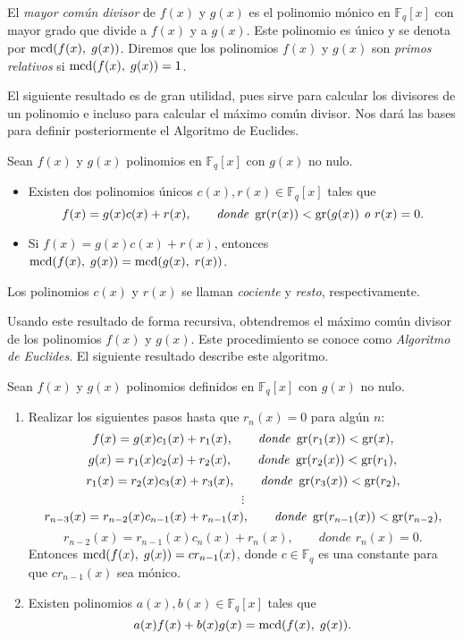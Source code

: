 El \emph{mayor común divisor} de $f(x)$ y $g(x)$ es el polinomio mónico en $\mathbb{F}_q[x]$ con mayor grado que divide a $f(x)$ y a $g(x)$. Este polinomio es único y se denota por $\operatorname{mcd}(f(x), \; g(x))$. Diremos que los polinomios $f(x)$ y $g(x)$ son \emph{primos relativos} si $\operatorname{mcd}(f(x), \; g(x)) = 1$.

El siguiente resultado es de gran utilidad, pues sirve para calcular los divisores de un polinomio e incluso para calcular el máximo común divisor. Nos dará las bases para definir posteriormente el Algoritmo de Euclides.

\begin{theorem}
    \label{th:div_alg}
    Sean $f(x)$ y $g(x)$ polinomios en $\mathbb{F}_q[x]$ con $g(x)$ no nulo.
    \begin{itemize}
        \item Existen dos polinomios únicos $c(x), r(x) \in \mathbb{F}_q[x]$ tales que
        $$f(x) = g(x) c(x) + r(x), \qquad \textit{donde } \operatorname{gr}(r(x)) < \operatorname{gr}(g(x)) \textit{ o } r(x) = 0.$$
        \item Si $f(x) = g(x) c(x) + r(x)$, entonces $\operatorname{mcd}(f(x), \; g(x)) = \operatorname{mcd}(g(x), \; r(x))$.
    \end{itemize}
\end{theorem}

Los polinomios $c(x)$ y $r(x)$ se llaman \emph{cociente} y \emph{resto}, respectivamente.

Usando este resultado de forma recursiva, obtendremos el máximo común divisor de los polinomios $f(x)$ y $g(x)$. Este procedimiento se conoce como \emph{Algoritmo de Euclides}. El siguiente resultado describe este algoritmo.

\begin{theorem}
    Sean $f(x)$ y $g(x)$ polinomios definidos en $\mathbb{F}_q[x]$ con $g(x)$ no nulo.
    \begin{enumerate}
        \item Realizar los siguientes pasos hasta que $r_n(x) = 0$ para algún $n$:
        $$f(x) = g(x) c_1(x) + r_1(x), \qquad \textit{donde } \operatorname{gr}(r_1(x)) < \operatorname{gr}(x),$$
        $$g(x) = r_1(x) c_2(x) + r_2(x), \qquad \textit{donde } \operatorname{gr}(r_2(x)) < \operatorname{gr}(r_1),$$
        $$r_1(x) = r_2(x) c_3(x) + r_3(x), \qquad \textit{donde } \operatorname{gr}(r_3(x)) < \operatorname{gr}(r_2),$$
        $$\vdots$$
        $$r_{n-3}(x) = r_{n-2}(x) c_{n-1}(x) + r_{n-1}(x), \qquad \textit{donde } \operatorname{gr}(r_{n-1}(x)) < \operatorname{gr}(r_{n-2}),$$
        $$r_{n-2}(x) = r_{n-1}(x) c_{n}(x) + r_{n}(x), \qquad \textit{donde } r_n(x) = 0.$$
        Entonces $\operatorname{mcd}(f(x), \; g(x)) = cr_{n-1}(x)$, donde $c \in \mathbb{F}_q$ es una constante para que $c r_{n-1}(x)$ sea mónico.
        \item Existen polinomios $a(x), b(x) \in \mathbb{F}_q[x]$ tales que 
        $$a(x) f(x) + b(x) g(x) = \operatorname{mcd}(f(x), \; g(x)).$$
    \end{enumerate}
\end{theorem}


